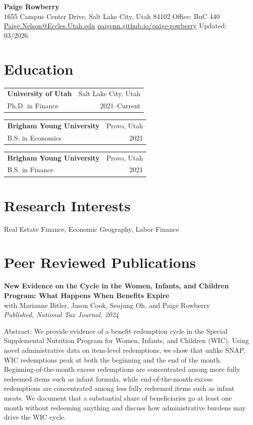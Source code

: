 \documentclass[11pt]{article}
\makeatletter
\newcommand{\eduentry}[4]{%
\begin{tabular*}{\textwidth}{@{}l@{\extracolsep{\fill}}r@{}}
\textbf{#1} & #2 \\
#3 & #4 \\
\end{tabular*}\vspace{0.6em}
}
\makeatother
\begin{document}
\pagestyle{plain}

\begin{center}
{\LARGE \textbf{Paige Rowberry}}\\[0.3em]
1655 Campus Center Drive, Salt Lake City, Utah 84102 \textbar{} Office: BuC 440\\
\href{mailto:Paige.Nelson@Eccles.Utah.edu}{Paige.Nelson@Eccles.Utah.edu} \textbar{}
\href{https://paigenn.github.io/paige-rowberry/}{paigenn.github.io/paige-rowberry} \textbar{} Updated: 03/2026
\end{center}

\section*{Education}
\eduentry{University of Utah}{Salt Lake City, Utah}{Ph.D. in Finance}{2021--Current}
\eduentry{Brigham Young University}{Provo, Utah}{B.S. in Economics}{2021}
\eduentry{Brigham Young University}{Provo, Utah}{B.S. in Finance}{2021}

\section*{Research Interests}
Real Estate Finance, Economic Geography, Labor Finance

\section*{Peer Reviewed Publications}
\textbf{New Evidence on the Cycle in the Women, Infants, and Children Program: What Happens When Benefits Expire}\\
with Marianne Bitler, Jason Cook, Seojung Oh, and Paige Rowberry\\
\emph{Published, National Tax Journal, 2024}

Abstract: We provide evidence of a benefit redemption cycle in the Special Supplemental Nutrition Program for Women, Infants, and Children (WIC). Using novel administrative data on item-level redemptions, we show that unlike SNAP, WIC redemptions peak at both the beginning and the end of the month. Beginning-of-the-month excess redemptions are concentrated among more fully redeemed items such as infant formula, while end-of-the-month excess redemptions are concentrated among less fully redeemed items such as infant meats. We document that a substantial share of beneficiaries go at least one month without redeeming anything and discuss how administrative burdens may drive the WIC cycle.
\end{document}
